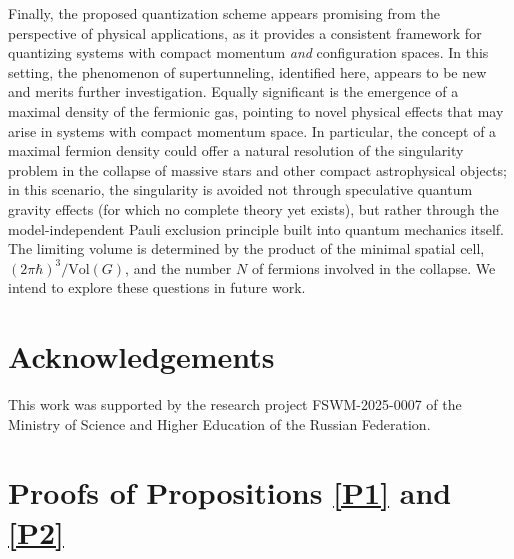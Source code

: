 \documentclass[12pt,a4paper]{article}
\numberwithin{equation}{section}
\theoremstyle{theorem}
\theoremstyle{remark}
\begin{document}
Finally, the proposed quantization scheme appears promising from the perspective of physical applications, as it provides a consistent framework for quantizing systems with compact momentum {\it and} configuration spaces. In this setting, the phenomenon of supertunneling, identified here, appears to be new and merits further investigation. Equally significant is the emergence of a maximal density of the fermionic gas, pointing to novel physical effects that may arise in systems with compact momentum space. In particular, the concept of a maximal fermion density could offer a natural resolution of the singularity problem in the collapse of massive stars and other compact astrophysical objects; in this scenario, the singularity is avoided not through speculative quantum gravity effects (for which no complete theory yet exists), but rather through the model-independent Pauli exclusion principle built into quantum mechanics itself.  The limiting volume is determined by the product of the minimal spatial cell, $(2\pi \hbar)^3/\mathrm{Vol}(G)$, and the number $N$ of fermions involved in the collapse. We intend to explore these questions in future work.


\section*{Acknowledgements}This work was supported by the research project FSWM-2025-0007 of the Ministry of Science and Higher Education of the Russian Federation.
\appendix 

\section{Proofs of Propositions \ref{P1} and \ref{P2}}\label{A}
\end{document}
